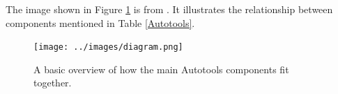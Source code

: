 \justifying
The image shown in Figure \ref{diagram} is from \cite{autobasics}.
It illustrates the relationship between components mentioned in Table \ref{Autotools}.
\vspace{2mm}

\begin{figure}[ht]
	\texttt{[image: ../images/diagram.png]}
	\caption{A basic overview of how the main Autotools components fit together.}
	\label{diagram}
\end{figure}
\vspace{2mm}


\clearpage
\begin{versionhistory}
\end{versionhistory}

\clearpage




